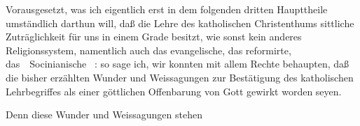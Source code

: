 
Vorausgesetzt, was ich eigentlich erst in dem folgenden dritten Haupttheile umständlich darthun will, daß die Lehre des katholischen Christenthums sittliche Zuträglichkeit für uns in einem Grade besitzt, wie sonst kein anderes Religionssystem, namentlich auch das evangelische, das reformirte, das~\ Socinianische \uam\ : so sage ich, wir konnten mit allem Rechte behaupten, daß die bisher erzählten Wunder und Weissagungen zur Bestätigung des katholischen Lehrbegriffes als einer göttlichen Offenbarung von Gott gewirkt worden seyen.\par
Denn diese Wunder und Weissagungen stehen
